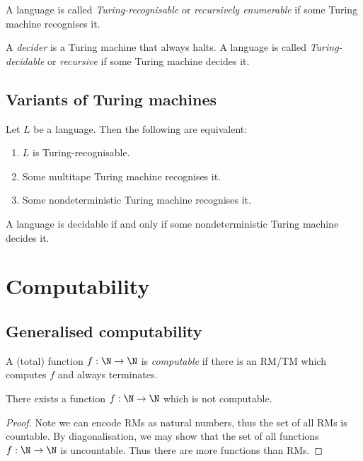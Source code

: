 \documentclass{article}
\begin{document}
\begin{definition}[Sipser p. 170]
	A language is called \emph{Turing-recognisable} or \emph{recursively enumerable}
	if some Turing machine recognises it.
\end{definition}

\begin{definition}[Sipser p. 170]
	A \emph{decider} is a Turing machine that always halts. A language is called
	\emph{Turing-decidable} or \emph{recursive} if some Turing machine decides it.
\end{definition}

\subsection{Variants of Turing machines}

\begin{theorem}[Sipser p. 176-180]
	Let $L$ be a language. Then the following are equivalent:
	\begin{enumerate}
		\item $L$ is Turing-recognisable.
		\item Some multitape Turing machine recognises it.
		\item Some nondeterministic Turing machine recognises it.
	\end{enumerate}
\end{theorem}

\begin{corollary}[Sipser p. 180]
	A language is decidable if and only if some nondeterministic Turing machine
	decides it.
\end{corollary}

\section{Computability}

\subsection{Generalised computability}

\begin{definition}
	A (total) function $f:\N\to\N$ is \emph{computable} if there is an RM/TM which
	computes $f$ and always terminates.
\end{definition}

\begin{theorem}
	There exists a function $f:\N\to\N$ which is not computable.
	\begin{proof}
		Note we can encode RMs as natural numbers, thus the set of all RMs is countable.
		By diagonalisation, we may show that the set of all functions $f:\N\to\N$ is
		uncountable. Thus there are more functions than RMs.
	\end{proof}
\end{theorem}
\end{document}
